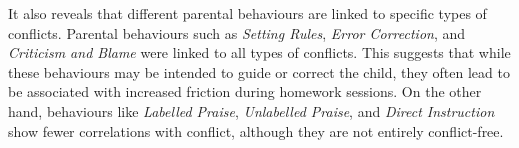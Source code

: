 

It also reveals that different parental behaviours are linked to specific types of conflicts. 
Parental behaviours such as \textit{Setting Rules}, \textit{Error Correction}, and \textit{Criticism and Blame} were linked to all types of conflicts. This suggests that while these behaviours may be intended to guide or correct the child, they often lead to be associated with increased friction during homework sessions. On the other hand, behaviours like \textit{Labelled Praise}, \textit{Unlabelled Praise}, and \textit{Direct Instruction} show fewer correlations with conflict, although they are not entirely conflict-free. %

